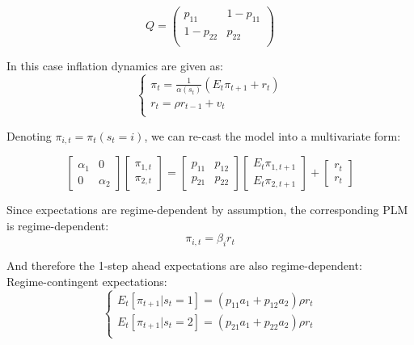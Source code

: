 \documentclass[12pt,reqno]{article}
\numberwithin{equation}{section}
\begin{document}
$$
Q=\begin{pmatrix}
p_{11} & 1-p_{11} \\
1-p_{22} & p_{22} \\
\end{pmatrix}
$$

In this case inflation dynamics are given as: \\

$$
\begin{cases}
\pi_t = \frac{1}{\alpha(s_t)}(E_t \pi_{t+1} + r_t) \\
r_t = \rho r_{t-1} + v_t \\
\end{cases}
$$

Denoting $\pi_{i,t} = \pi_t (s_t=i)$, we can re-cast the model into a multivariate form:

$$
\begin{bmatrix} \alpha_1 & 0 \\ 0 & \alpha_2 \end{bmatrix} \begin{bmatrix} \pi_{1,t}  \\ \pi_{2,t}  \end{bmatrix} = \begin{bmatrix} p_{11} & p_{12} \\ p_{21} & p_{22} \end{bmatrix} \begin{bmatrix} E_t \pi_{1,t+1} \\ E_t \pi_{2,t+1} \end{bmatrix} + \begin{bmatrix}r_t \\ r_t \end{bmatrix}
$$

Since expectations are regime-dependent by assumption, the corresponding PLM is regime-dependent: \\

$$
\pi_{i,t} = \beta_i r_t 
$$

And therefore the 1-step ahead expectations are also regime-dependent: \\

Regime-contingent expectations: \\

$$
\begin{cases}
E_t [\pi_{t+1} | s_t = 1] = (p_{11} a_1 + p_{12} a_2 ) \rho r_t \\
E_t [\pi_{t+1} | s_t = 2] = (p_{21} a_1 + p_{22} a_2 ) \rho r_t \\
\end{cases}
$$
\end{document}
